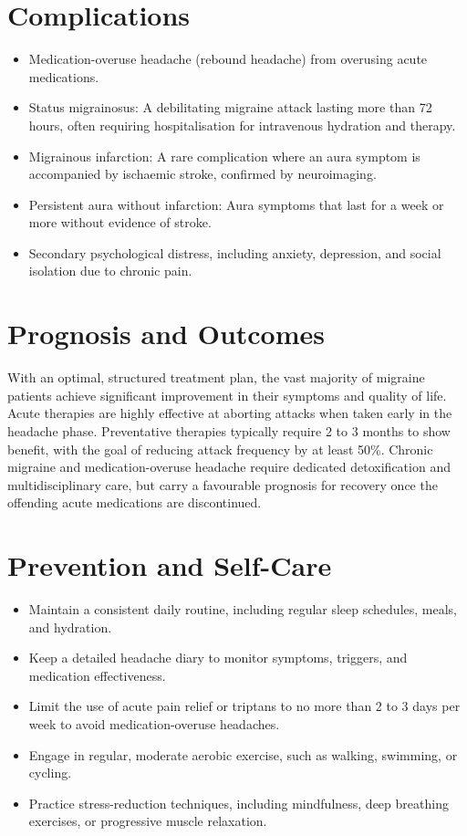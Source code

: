 \section*{Complications}
\begin{itemize}
    \item Medication-overuse headache (rebound headache) from overusing acute medications.
    \item Status migrainosus: A debilitating migraine attack lasting more than 72 hours, often requiring hospitalisation for intravenous hydration and therapy.
    \item Migrainous infarction: A rare complication where an aura symptom is accompanied by ischaemic stroke, confirmed by neuroimaging.
    \item Persistent aura without infarction: Aura symptoms that last for a week or more without evidence of stroke.
    \item Secondary psychological distress, including anxiety, depression, and social isolation due to chronic pain.
\end{itemize}

\section*{Prognosis and Outcomes}
With an optimal, structured treatment plan, the vast majority of migraine patients achieve significant improvement in their symptoms and quality of life. Acute therapies are highly effective at aborting attacks when taken early in the headache phase. Preventative therapies typically require 2 to 3 months to show benefit, with the goal of reducing attack frequency by at least 50\%. Chronic migraine and medication-overuse headache require dedicated detoxification and multidisciplinary care, but carry a favourable prognosis for recovery once the offending acute medications are discontinued.

\section*{Prevention and Self-Care}
\begin{itemize}
    \item Maintain a consistent daily routine, including regular sleep schedules, meals, and hydration.
    \item Keep a detailed headache diary to monitor symptoms, triggers, and medication effectiveness.
    \item Limit the use of acute pain relief or triptans to no more than 2 to 3 days per week to avoid medication-overuse headaches.
    \item Engage in regular, moderate aerobic exercise, such as walking, swimming, or cycling.
    \item Practice stress-reduction techniques, including mindfulness, deep breathing exercises, or progressive muscle relaxation.
\end{itemize}

